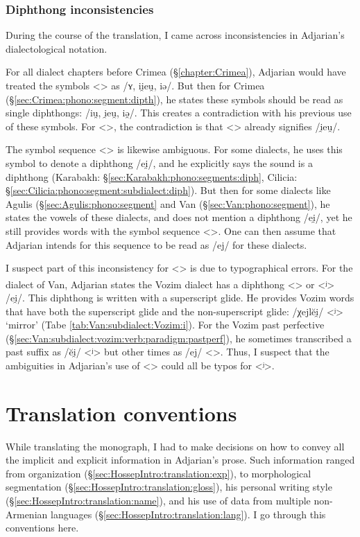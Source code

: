 \subsubsection{Diphthong inconsistencies}\label{sec:HossepIntro:phonotransc:adjerror}

During the course of the translation, I came across inconsistencies in Adjarian's dialectological notation. 

For all dialect chapters before Crimea (\S\ref{chapter:Crimea}), Adjarian would have treated the symbols <> as  /ʏ, ii̯eu̯, iə/. But then for Crimea (\S\ref{sec:Crimea:phono:segment:dipth}), he states these symbols should be read as single diphthongs: /iu̯, i̯eu̯,  iə̯/. This creates a contradiction with his previous use of these symbols. For <>, the contradiction is that <> already signifies /i̯eu̯/. 


The symbol sequence <> is likewise ambiguous. For some dialects, he uses this symbol to denote a diphthong /ei̯/, and he explicitly says the sound is a diphthong (Karabakh: \S\ref{sec:Karabakh:phono:segments:diph}, Cilicia: \S\ref{sec:Cilicia:phono:segment:subdialect:diph}). But then for some dialects like Agulis (\S\ref{sec:Agulis:phono:segment} and Van (\S\ref{sec:Van:phono:segment}), he states the vowels of these dialects, and does not mention a diphthong /ei̯/, yet he still provides words with the symbol sequence <>. One can then assume that Adjarian intends for this sequence to be read as /ej/ for these dialects.  

I suspect part of this inconsistency for <> is due to typographical errors. For the dialect of Van, Adjarian states the Vozim dialect has a diphthong <\textsuperscript{}> or <ʲ> /ei̯/. This diphthong is written with a superscript glide. He provides Vozim words that have both the superscript glide and the non-superscript glide: /χejlĕi̯/ <ʲ> `mirror' (Tabe \ref{tab:Van:subdialect:Vozim:i}).   For the Vozim past perfective (\S\ref{sec:Van:subdialect:vozim:verb:paradigm:pastperf}), he sometimes transcribed a past suffix as /ĕi̯/ <ʲ> but other times as /ej/ <>. Thus, I suspect that the ambiguities in Adjarian's use of <> could all be typos for <ʲ>. 


 

\section{Translation conventions}\label{sec:HossepIntro:translation}
While translating the monograph, I had to make decisions on how to convey all the implicit and explicit information in Adjarian's prose. Such information ranged from organization (\S\ref{sec:HossepIntro:translation:exp}), to morphological segmentation (\S\ref{sec:HossepIntro:translation:gloss}),   his personal writing style (\S\ref{sec:HossepIntro:translation:name}), and his use of data from multiple non-Armenian languages (\S\ref{sec:HossepIntro:translation:lang}). I go through this conventions here. 
